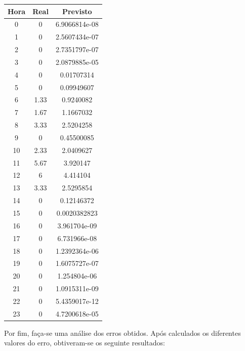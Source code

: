 \documentclass[a4paper, 12pt]{article}
\begin{document}
\begin{table}[H]
	\centering
	\begin{tabular}{||c||c|c||}
		\hline\hline
		Hora & Real&Previsto\\
		\hline\hline
		0 & 
0
 & 6.9066814e-08 \\
		\hline
		1  &
0 & 2.5607434e-07\\
		\hline
		2 & 0 & 2.7351797e-07\\
		\hline
		3  & 0

 &2.0879885e-05 \\
		\hline
		4 & 0
 &0.01707314 \\
		\hline
		5  &0 
 &0.09949607 \\
		\hline
		6 & 1.33

 & 

0.9240082 \\
		\hline
		7 & 1.67

 & 1.1667032\\
		\hline
		8  &3.33
 & 2.5204258\\
		\hline
		9 & 0 &  0.45500085\\
		\hline
		10 & 
2.33
 &  2.0409627 \\
		\hline
		11  &
5.67 &3.920147 \\
		\hline
		12 & 6 &  4.414104\\
		\hline
		13  & 
3.33
 & 2.5295854 \\
		\hline
		14 & 
0  & 0.12146372\\
		\hline
		15  & 0
 &0.0020382823 \\
		\hline
		16 & 0
 & 
3.961704e-09 \\
		\hline
		17 & 
0
 & 6.731966e-08 \\
		\hline
		18  &
0 &1.2392364e-06 \\
		\hline
		19 &0  & 1.6075727e-07	\\
		\hline
		20 & 

0 & 1.254804e-06\\
		\hline
		21  &
0 & 1.0915311e-09\\
		\hline
		22 & 0 & 5.4359017e-12	\\
		\hline
		23  & 0

 & 4.7200618e-05 \\
		\hline\hline
	\end{tabular}
\end{table} 

Por fim, faça-se uma análise dos erros obtidos. Após calculados os diferentes valores do erro, obtiveram-se os seguinte resultados:
\end{document}
